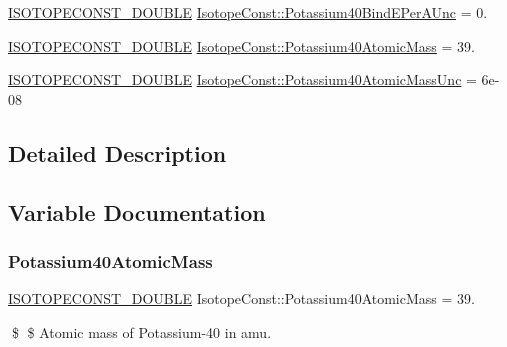 \begin{DoxyCompactItemize}
\mbox{\hyperlink{group___isotope_const-_macros_ga8f45a7272ce02c0b4c65c44636ed719a}{I\+S\+O\+T\+O\+P\+E\+C\+O\+N\+S\+T\+\_\+\+D\+O\+U\+B\+LE}} \mbox{\hyperlink{group___isotope_const-_potassium-_k40_ga6eb068669ccd1feae21c766d24dfb52c}{Isotope\+Const\+::\+Potassium40\+Bind\+E\+Per\+A\+Unc}} = 0.
\item 
\mbox{\hyperlink{group___isotope_const-_macros_ga8f45a7272ce02c0b4c65c44636ed719a}{I\+S\+O\+T\+O\+P\+E\+C\+O\+N\+S\+T\+\_\+\+D\+O\+U\+B\+LE}} \mbox{\hyperlink{group___isotope_const-_potassium-_k40_ga1af758e5e718cff47d09680ced3f4526}{Isotope\+Const\+::\+Potassium40\+Atomic\+Mass}} = 39.
\item 
\mbox{\hyperlink{group___isotope_const-_macros_ga8f45a7272ce02c0b4c65c44636ed719a}{I\+S\+O\+T\+O\+P\+E\+C\+O\+N\+S\+T\+\_\+\+D\+O\+U\+B\+LE}} \mbox{\hyperlink{group___isotope_const-_potassium-_k40_gab2bfc46de16832640b9cd499f09c57e1}{Isotope\+Const\+::\+Potassium40\+Atomic\+Mass\+Unc}} = 6e-\/08
\end{DoxyCompactItemize}


\subsection{Detailed Description}


\subsection{Variable Documentation}
\mbox{\label{group___isotope_const-_potassium-_k40_ga1af758e5e718cff47d09680ced3f4526}} 
\subsubsection{\texorpdfstring{Potassium40\+Atomic\+Mass}{Potassium40AtomicMass}}
{\footnotesize\ttfamily \mbox{\hyperlink{group___isotope_const-_macros_ga8f45a7272ce02c0b4c65c44636ed719a}{I\+S\+O\+T\+O\+P\+E\+C\+O\+N\+S\+T\+\_\+\+D\+O\+U\+B\+LE}} Isotope\+Const\+::\+Potassium40\+Atomic\+Mass = 39.}

\$ \$ Atomic mass of Potassium-\/40 in amu. \mbox{\label{group___isotope_const-_potassium-_k40_gab2bfc46de16832640b9cd499f09c57e1}} 
